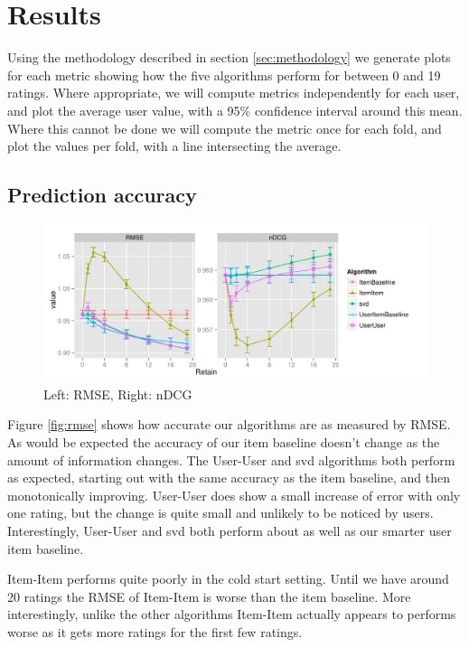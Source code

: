 \documentclass[letterpaper]{sig-alternate}
\begin{document}
\section{Results}

  Using the methodology described in section \ref{sec:methodology} we generate plots for each metric showing how the five algorithms perform for between 0 and 19 ratings.
  Where appropriate, we will compute metrics independently for each user, and plot the average user value, with a 95\% confidence interval around this mean.
  Where this cannot be done we will compute the metric once for each fold, and plot the values per fold, with a line intersecting the average.

\subsection{Prediction accuracy}
\begin{figure}
  \centering

  \includegraphics[width=\linewidth]{../lenskit/output/ekstrandTuned20/accuracy.pdf}
  \caption{Left: RMSE, Right: nDCG}
  \label{fig:rmse}
  \label{fig:ndcg}
\end{figure}
  Figure \ref{fig:rmse} shows how accurate our algorithms are as measured by RMSE.
  As would be expected the accuracy of our item baseline doesn't change as the amount of information changes.
  The User-User and svd algorithms both perform as expected, starting out with the same accuracy as the item baseline, and then monotonically improving.
  User-User does show a small increase of error with only one rating, but the change is quite small and unlikely to be noticed by users.
  Interestingly, User-User and svd both perform about as well as our smarter user item baseline. %

  Item-Item performs quite poorly in the cold start setting.
  Until we have around 20 ratings the RMSE of Item-Item is worse than the item baseline.
  More interestingly, unlike the other algorithms Item-Item actually appears to performs worse as it gets more ratings for the first few ratings.
  
\end{document}
